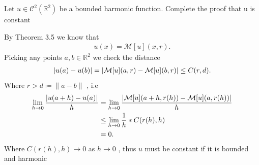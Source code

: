 \begin{exercise}[c]
 Let $u \in  \mathcal{C}^{2}(\mathbb{R}^{2} ) $ be a bounded harmonic function. Complete the proof that u is constant 
\end{exercise}
\begin{solution}
 By Theorem 3.5 we know that
 \begin{align*}
   u(x) = \mathcal{M}[u](x,r)
 .\end{align*}
Picking any points $a,b \in  \mathbb{R}^{2} $ we check the distance
\begin{align*}
  \lvert u(a)-u(b)\rvert = \lvert\mathcal{M}[u](a,r) - \mathcal{M}[u](b,r)\rvert \le C(r,d)
.\end{align*}
Where $r >d \coloneqq  \|a-b\|$ , i.e 
\begin{align*}
  \lim_{h \to 0} \frac{\abs{u(a+h) - u(a)}}{h} &= \lim_{h \to 0} \frac{\abs{\mathcal{M}[u](a+h,r(h)) - \mathcal{M}[u](a,r(h))}}{h}\\
                                               &\le \lim_{h\to 0} \frac{1}{h} * C(r(h),h) \\
                                               &=0
.\end{align*}
Where $C(r(h),h) \to  0$ as $h\to 0$  , thus $u$ must be constant if it is bounded and harmonic
\end{solution}
